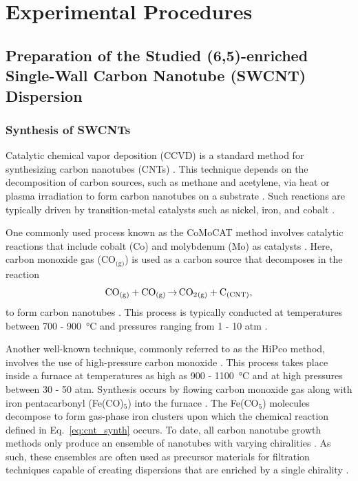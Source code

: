 \chapter{Experimental Procedures}

\section{Preparation of the Studied (6,5)-enriched Single-Wall Carbon Nanotube (SWCNT) Dispersion }

\subsection{Synthesis of SWCNTs}
\label{section:cnt_synthesis}
Catalytic chemical vapor deposition (CCVD) is a standard method for synthesizing carbon nanotubes (CNTs) \cite{prasek2011methods, agboola2007conceptual}. This technique depends on the decomposition of carbon sources, such as methane and acetylene, via heat or plasma irradiation to form carbon nanotubes on a substrate \cite{agboola2007conceptual}. Such reactions are typically driven by transition-metal catalysts such as nickel, iron, and cobalt \cite{prasek2011methods}.

One commonly used process known as the CoMoCAT method involves catalytic reactions that include cobalt (Co) and molybdenum (Mo) as catalysts \cite{resasco2002scalable}. Here, carbon monoxide gas (CO$_\text{(g)}$) is used as a carbon source that decomposes in the reaction
\vspace{-2mm}
\begin{equation}
\label{eq:cnt_synth}
\ce{CO_{(g)} + CO_{(g)} $\rightarrow$ CO_2_{\text{(g)}} + C_{(CNT)}},
\end{equation}
to form carbon nanotubes \cite{resasco2002scalable}. This process is typically conducted at temperatures between 700 - \SI{900}{\celsius} and pressures ranging from 1 - 10 atm \cite{resasco2002scalable}.

Another well-known technique, commonly referred to as the HiPco method, involves the use of high-pressure carbon monoxide \cite{bronikowski2001gas, nikolaev1999gas}. This process takes place inside a furnace at temperatures as high as 900 - \SI{1100}{\celsius} and at high pressures between 30 - 50 atm. Synthesis occurs by flowing carbon monoxide gas along with iron pentacarbonyl (Fe(CO)$_5$) into the furnace \cite{nikolaev1999gas}. The Fe(CO$_5$) molecules decompose to form gas-phase iron clusters upon which the chemical reaction defined in Eq.\ \eqref{eq:cnt_synth} occurs. To date, all carbon nanotube growth methods only produce an ensemble of nanotubes with varying chiralities \cite{agboola2007conceptual}. As such, these ensembles are often used as precursor materials for filtration techniques capable of creating dispersions that are enriched by a single chirality \cite{ichinose2017extraction, liu2011large}.


